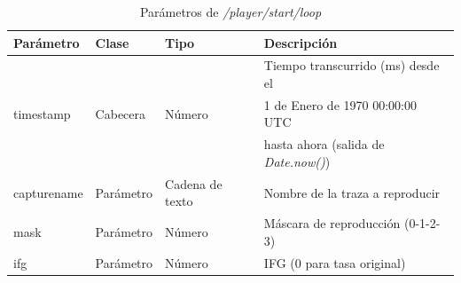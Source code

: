 \begin{table}[H]
\centering
\begin{tabular}{|l|l|l|l|}
\hline
\rowcolor[HTML]{F5F5F5}
\textbf{Parámetro}  & \textbf{Clase} & \textbf{Tipo}   & \textbf{Descripción}                        \\ \hline
                    &                &                 & Tiempo transcurrido (ms) desde el           \\
timestamp           & Cabecera       & Número          & 1 de Enero de 1970 00:00:00 UTC             \\
                    &                &                 & hasta ahora (salida de \textit{Date.now()}) \\ \hline
capturename         & Parámetro      & Cadena de texto & Nombre de la \gls{traza} a reproducir       \\ \hline
mask                & Parámetro      & Número          & Máscara de reproducción (0-1-2-3)           \\ \hline
ifg                 & Parámetro      & Número          & \gls{IFG} (0 para tasa original)            \\ \hline
\end{tabular}
\caption{Parámetros de \textit{/player/start/loop}}
\label{extra:api:playerstartloop:invocacion}
\end{table}

